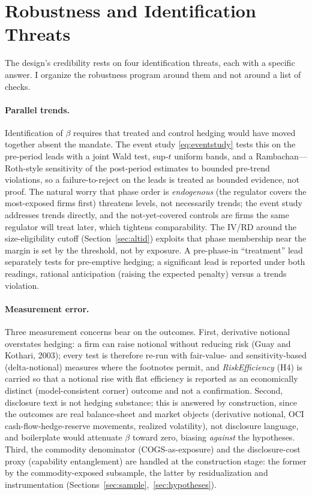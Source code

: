 \documentclass[11pt,a4paper]{article}
\begin{document}
\section{Robustness and Identification Threats}
\label{sec:robust}

The design's credibility rests on four identification threats, each with a specific answer. I organize the robustness program around them and not around a list of checks.

\paragraph{Parallel trends.} Identification of $\beta$ requires that treated and control hedging would have moved together absent the mandate. The event study \eqref{eq:eventstudy} tests this on the pre-period leads with a joint Wald test, sup-$t$ uniform bands, and a Rambachan---Roth-style sensitivity of the post-period estimates to bounded pre-trend violations, so a failure-to-reject on the leads is treated as bounded evidence, not proof. The natural worry that phase order is \emph{endogenous} (the regulator covers the most-exposed firms first) threatens levels, not necessarily trends; the event study addresses trends directly, and the not-yet-covered controls are firms the same regulator will treat later, which tightens comparability. The IV/RD around the size-eligibility cutoff (Section~\ref{sec:altid}) exploits that phase membership near the margin is set by the threshold, not by exposure. A pre-phase-in ``treatment'' lead separately tests for pre-emptive hedging; a significant lead is reported under both readings, rational anticipation (raising the expected penalty) versus a trends violation.

\paragraph{Measurement error.} Three measurement concerns bear on the outcomes. First, derivative notional overstates hedging: a firm can raise notional without reducing risk (Guay and Kothari, 2003); every test is therefore re-run with fair-value- and sensitivity-based (delta-notional) measures where the footnotes permit, and \emph{RiskEfficiency} (H4) is carried so that a notional rise with flat efficiency is reported as an economically distinct (model-consistent corner) outcome and not a confirmation. Second, disclosure text is not hedging substance; this is answered by construction, since the outcomes are real balance-sheet and market objects (derivative notional, OCI cash-flow-hedge-reserve movements, realized volatility), not disclosure language, and boilerplate would attenuate $\beta$ toward zero, biasing \emph{against} the hypotheses. Third, the commodity denominator (COGS-as-exposure) and the disclosure-cost proxy (capability entanglement) are handled at the construction stage: the former by the commodity-exposed subsample, the latter by residualization and instrumentation (Sections~\ref{sec:sample},~\ref{sec:hypotheses}).
\end{document}
